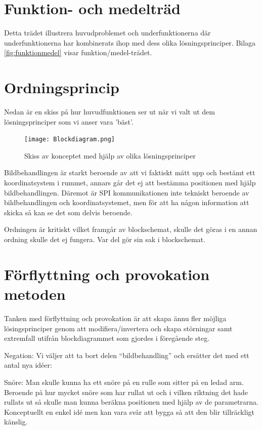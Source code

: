 \documentclass[11pt, a4paper]{report}
\begin{document}
\section{Funktion- och medelträd}

Detta trädet illustrera huvudproblemet och underfunktionerna där underfunktionerna har kombinerats ihop med dess olika lösningsprinciper. Bilaga \ref{fig:funktionmedel} visar funktion/medel-trädet.


\section{Ordningsprincip}

Nedan är en skiss på hur huvudfunktionen ser ut när vi valt ut dem lösningsprinciper som vi anser vara 'bäst'. \\


\begin{figure}[H]
	\begin{center}
		\texttt{[image: Blockdiagram.png]}
		\caption{Skiss av konceptet med hjälp av olika lösningsprinciper}
		\label{fig:blockdiagram}
	\end{center}
\end{figure}

Bildbehandlingen är starkt beroende av att vi faktiskt mätt upp och bestämt ett koordinatsystem i rummet, annars går det ej att bestämma positionen med hjälp bildbehandlingen. Däremot är SPI kommunikationen inte tekniskt beroende av bildbehandlingen och koordinatsystemet, men för att ha någon information att skicka så kan se det som delvis beroende.

Ordningen är kritiskt vilket framgår av blockschemat, skulle det göras i en annan ordning skulle det ej fungera. Var del gör sin sak i blockschemat.\\


\section{Förflyttning och provokation metoden}

Tanken med förflyttning och provokation är att skapa ännu fler möjliga lösingsprinciper genom att modifiera/invertera och skapa störningar samt extremfall utifrån blockdiagrammet som gjordes i föregående steg. 

Negation:
Vi väljer att ta bort delen “bildbehandling” och ersätter det med ett antal nya idéer:

Snöre:
Man skulle kunna ha ett snöre på en rulle som sitter på en ledad arm. Beroende på hur mycket snöre som har rullat ut och i vilken riktning det hade rullats ut så skulle man kunna beräkna positionen med hjälp av de parametrarna.
Konceptuellt en enkel idé men kan vara svår att bygga så att den blir tillräckligt känslig.
\end{document}
